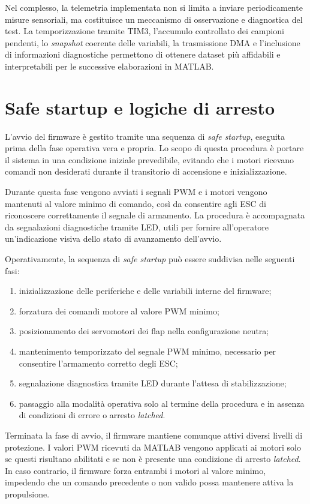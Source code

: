 \documentclass[11pt]{report}
\begin{document}
Nel complesso, la telemetria implementata non si limita a inviare periodicamente misure sensoriali, ma costituisce un meccanismo di osservazione e diagnostica del test. La temporizzazione tramite TIM3, l'accumulo controllato dei campioni pendenti, lo \textit{snapshot} coerente delle variabili, la trasmissione DMA e l'inclusione di informazioni diagnostiche permettono di ottenere dataset più affidabili e interpretabili per le successive elaborazioni in MATLAB.

\section{Safe startup e logiche di arresto}
L'avvio del firmware è gestito tramite una sequenza di \textit{safe startup}, eseguita prima della fase operativa vera e propria. Lo scopo di questa procedura è portare il sistema in una condizione iniziale prevedibile, evitando che i motori ricevano comandi non desiderati durante il transitorio di accensione e inizializzazione.

Durante questa fase vengono avviati i segnali PWM e i motori vengono mantenuti al valore minimo di comando, così da consentire agli ESC di riconoscere correttamente il segnale di armamento. La procedura è accompagnata da segnalazioni diagnostiche tramite LED, utili per fornire all'operatore un'indicazione visiva dello stato di avanzamento dell'avvio.

Operativamente, la sequenza di \textit{safe startup} può essere suddivisa nelle seguenti fasi:
\begin{enumerate}
    \item inizializzazione delle periferiche e delle variabili interne del firmware;
    \item forzatura dei comandi motore al valore PWM minimo;
    \item posizionamento dei servomotori dei flap nella configurazione neutra;
    \item mantenimento temporizzato del segnale PWM minimo, necessario per consentire l'armamento corretto degli ESC;
    \item segnalazione diagnostica tramite LED durante l'attesa di stabilizzazione;
    \item passaggio alla modalità operativa solo al termine della procedura e in assenza di condizioni di errore o arresto \textit{latched}.
\end{enumerate}


Terminata la fase di avvio, il firmware mantiene comunque attivi diversi livelli di protezione. I valori PWM ricevuti da MATLAB vengono applicati ai motori solo se questi risultano abilitati e se non è presente una condizione di arresto \textit{latched}. In caso contrario, il firmware forza entrambi i motori al valore minimo, impedendo che un comando precedente o non valido possa mantenere attiva la propulsione.
\end{document}
